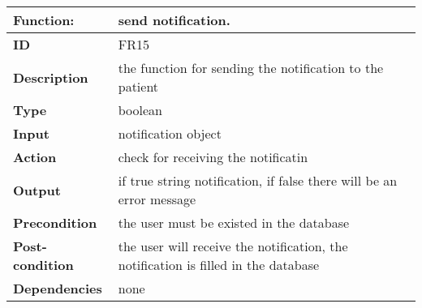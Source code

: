 \documentclass[]{article}
\begin{document}
\FloatBarrier
\begin{table}[h]
\caption{}
\label{tab:my-table}
\begin{tabular}{|p{}|p{}|}
\hline
\textbf{Function:} & send notification.
\\ \hline
\textbf{ID}  & FR15           

\\ \hline
\textbf{Description}    & the function for sending the notification to the patient                                                                 
\\ \hline
\textbf{Type}    &  boolean       

\\ \hline
\textbf{Input}        & notification object


\\ \hline
\textbf{Action}            & check for receiving the notificatin 

\\ \hline
\textbf{Output}            & if true string notification, if false there will be an error message 

\\ \hline
\textbf{Precondition}           & the user must be existed in the database  

\\ \hline
\textbf{Post-condition}           & the user will receive the notification, the notification is filled in the database


\\ \hline
\textbf{Dependencies}           & none
\\ \hline
\end{tabular}
\end{table}
\FloatBarrier
\end{document}
